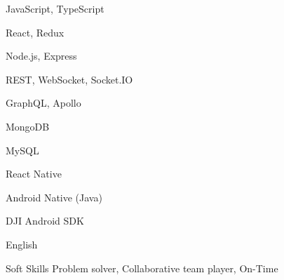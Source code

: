 \begin{cvskills}
  \cvskill
    {JavaScript, TypeScript} %
    {} %

  \cvskill
    {React, Redux} %
    {} %

  \cvskill
    {Node.js, Express} %
    {} %

  \cvskill
    {REST, WebSocket, Socket.IO} %
    {} %

  \cvskill
    {GraphQL, Apollo} %
    {} %

  \cvskill
    {MongoDB} %
    {} %

  \cvskill
    {MySQL} %
    {} %

  \cvskill
    {React Native} %
    {} %

  \cvskill
    {Android Native (Java)} %
    {} %

  \cvskill
    {DJI Android SDK} %
    {} %

  \cvskill
    {English} %
    {} %

  \cvskill
    {Soft Skills} %
    {Problem solver, Collaborative team player, On-Time} %

\end{cvskills}
